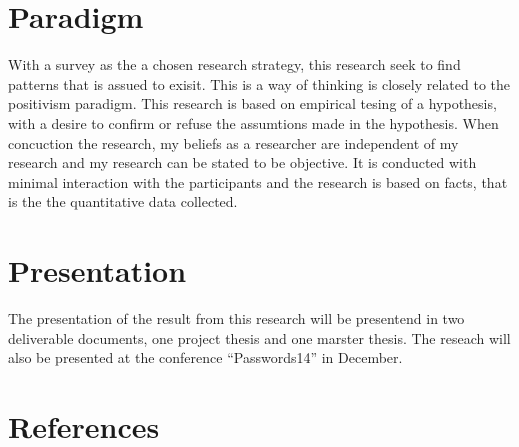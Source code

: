   \section*{Paradigm}
  With a survey as the a chosen research strategy, this research seek to find patterns that is assued to exisit. This is a way of thinking is closely related to the positivism paradigm. This research is based on empirical tesing of a hypothesis, with a desire to confirm or refuse the assumtions made in the hypothesis.
  When concuction the research, my beliefs as a researcher are independent of my research and my research can be stated to be objective. It is conducted with minimal interaction with the participants and the research is based on facts, that is the the quantitative data collected. 

  \section*{Presentation}

    The presentation of the result from this research will be presentend in two deliverable documents, one project thesis and one marster thesis. The reseach will also be presented at the conference ``Passwords14''\cite{passwords} in December. 



  \section*{References}
  \renewcommand{\bibsection}{ }
  
  







  